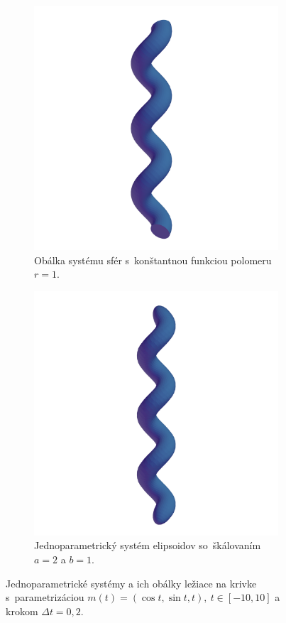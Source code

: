 \begin{figure}[t!]
\begin{subfigure}[t]{0.32\textwidth}
        \includegraphics[width=\textwidth]{images/helix_envelope2.png}
        	\caption{Obálka systému sfér s~konštantnou funkciou polomeru $r=1$.}
        \label{fig:plocha8}
    \end{subfigure}
    \hfill
    \begin{subfigure}[t]{0.32\textwidth}
        \centering
        \includegraphics[width=\textwidth]{images/helix_ellipsoids2.png}
        	\caption{Jednoparametrický systém elipsoidov so~škálovaním $a=2$ a $b=1$.}
        \label{fig:plocha9}
    \end{subfigure}
    	\caption[Jednoparametrické systémy a ich obálky ležiace na krivke skrutkovica.]{Jednoparametrické systémy a ich obálky ležiace na krivke s~parametrizáciou  $m(t)=(\cos t, \sin t, t), \  t \in [-10, 10]$ a krokom $\Delta t = 0,2$.}
    \label{fig:katalogII}
\end{figure}